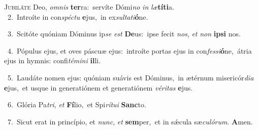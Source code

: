 \lettrine{\initial\textcolor{\initialcolor}{J}}{ubiláte} Deo, \textit{om}\-\textit{nis} \textbf{ter}\-ra:~\star servíte Dómi\textit{no} \textit{in} \textit{læ}\-\textbf{tí}\textbf{ti}a.\\
{\numbfont\textcolor{\numbcolor}{~2.}}~Introíte in con\-\textit{spéc}\-\textit{tu} \textbf{e}\-jus,~\star in ex\-\textit{sul}\-\textit{ta}\textit{ti}\textbf{ó}ne.\par
{\numbfont\textcolor{\numbcolor}{~3.}}~Scitóte quóniam Dóminus ip\textit{se} \textit{est} \textbf{De}\-us:~\star ipse fecit \textit{nos}\-, \textit{et} \textit{non} \textbf{ip}\-\textbf{si} nos.\par
{\numbfont\textcolor{\numbcolor}{~4.}}~Pópulus ejus, et oves páscuæ ejus:~\dagger introíte portas ejus in con\-\textit{fes}\-\textit{si}\textbf{ó}ne,~\star átria ejus in hymnis: confi\-\textit{té}\-\textit{mi}\textit{ni} \textbf{il}\-li.\par
{\numbfont\textcolor{\numbcolor}{~5.}}~Laudáte nomen ejus: quóniam suávis est Dóminus,~\dagger in ætérnum misericór\-\textit{di}\-\textit{a} \textbf{e}\-jus,~\star et usque in generatiónem et generatiónem \textit{vé}\-\textit{ri}\textit{tas} \textbf{e}\-jus.\par
{\numbfont\textcolor{\numbcolor}{~6.}}~Glória Pa\-\textit{tri}\-, \textit{et} \textbf{Fí}\-lio,~\star et Spi\-\textit{rí}\-\textit{tu}\textit{i} \textbf{Sanc}\-to.\par
{\numbfont\textcolor{\numbcolor}{~7.}}~Sicut erat in princípio, et \textit{nunc}\-, \textit{et} \textbf{sem}\-per,~\star et in sǽcula sæ\-\textit{cu}\-\textit{ló}\textit{rum}. \textbf{A}\-men.\par

